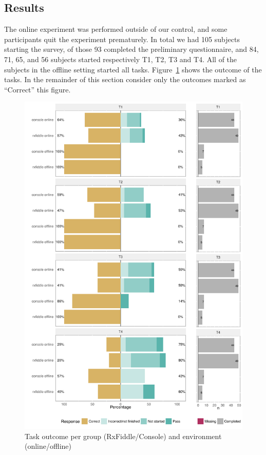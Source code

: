 \subsection{Results}
The online experiment was performed outside of our control, and some participants quit the experiment prematurely. In total we had 105 subjects starting the survey, of those 93 completed the preliminary questionnaire, and 84, 71, 65, and 56 subjects started respectively T1, T2, T3 and T4. All of the subjects in the offline setting started all tasks. Figure~\ref{fig:resultPerTask} shows the outcome of the tasks. In the remainder of this section consider only the outcomes marked as ``Correct'' this figure.

\begin{figure}[t]
\includegraphics[width=\columnwidth]{images/resultPerTask.pdf}
\caption{Task outcome per group (RxFiddle/Console) and environment (online/offline)}
\label{fig:resultPerTask}
\end{figure}

